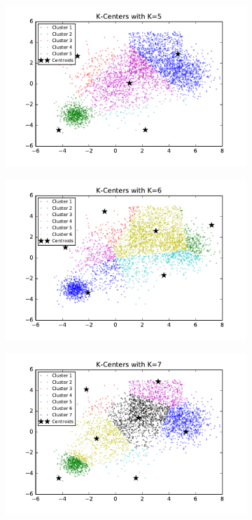 \begin{description}
\begin{description}
\begin{figure}[!h]
\begin{subfigure}[b]{0.475\textwidth}
            \includegraphics[width=\textwidth]{./figures/bigClustering_kCenter_5.pdf}
        \end{subfigure}
        \hfill
        \begin{subfigure}[b]{0.475\textwidth}   
            \centering 
            \includegraphics[width=\textwidth]{./figures/bigClustering_kCenter_6.pdf}
        \end{subfigure}
        \begin{subfigure}[b]{0.475\textwidth}   
            \centering 
            \includegraphics[width=\textwidth]{./figures/bigClustering_kCenter_7.pdf}

\end{subfigure}
\end{figure}
\end{description}
\end{description}
